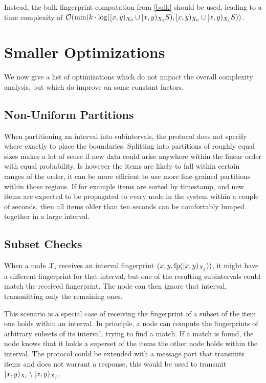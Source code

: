 Instead, the bulk fingerprint computation from \cref{bulk} should be used, leading to a time complexity of $\mathcal{O}(\min(k \cdot \log([{x},{y})_{X_0} \cup [{x},{y})_{X_1}{S}), [{x},{y})_{X_0} \cup [{x},{y})_{X_1}{S}))$.

\section{Smaller Optimizations}
\label{set-reconciliation-simple-optimizations}

We now give a list of optimizations which do not impact the overall complexity analysis, but which do improve on some constant factors.

\subsection{Non-Uniform Partitions}

When partitioning an interval into subintervals, the protocol does not specify where exactly to place the boundaries. Splitting into partitions of roughly equal sizes makes a lot of sense if new data could arise anywhere within the linear order with equal probability. Is however the items are likely to fall within certain ranges of the order, it can be more efficient to use more fine-grained partitions within those regions. If for example items are sorted by timestamp, and new items are expected to be propagated to every node in the system within a couple of seconds, then all items older than ten seconds can be comfortably lumped together in a large interval.

\subsection{Subset Checks}
\label{subset-checks}

When a node $\mathcal{X}_i$ receives an interval fingerprint $({x}, {y}, {\operatorname{fp}([{x},{y})_{X_j})})$, it might have a different fingerprint for that interval, but one of the resulting subintervals could match the received fingerprint. The node can then ignore that interval, transmitting only the remaining ones.

This scenario is a special case of receiving the fingerprint of a subset of the item one holds within an interval. In principle, a node can compute the fingerprints of arbitrary subsets of its interval, trying to find a match. If a match is found, the node knows that it holds a superset of the items the other node holds within the interval. The protocol could be extended with a message part that transmits items and does not warrant a response, this would be used to transmit $[{x},{y})_{X_i} \setminus [{x},{y})_{X_j}$.

